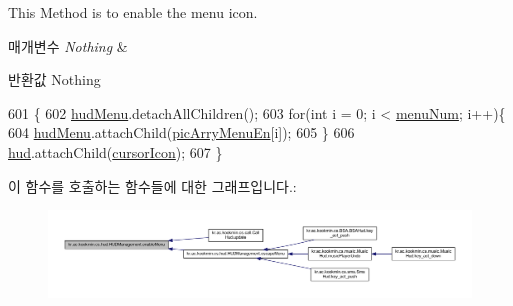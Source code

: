 This Method is to enable the menu icon. 


\begin{DoxyParams}{매개변수}
{\em Nothing} & \\
\hline
\end{DoxyParams}
\begin{DoxyReturn}{반환값}
Nothing 
\end{DoxyReturn}

\begin{DoxyCode}
601   \{
602     \hyperlink{classkr_1_1ac_1_1kookmin_1_1cs_1_1hud_1_1_h_u_d_management_a42b564e79a47075337594ae2a83f4309}{hudMenu}.detachAllChildren();
603     \textcolor{keywordflow}{for}(\textcolor{keywordtype}{int} i = 0; i < \hyperlink{classkr_1_1ac_1_1kookmin_1_1cs_1_1hud_1_1_h_u_d_management_af69baaadf8bdb8b4f429269357fb84d9}{menuNum}; i++)\{
604       \hyperlink{classkr_1_1ac_1_1kookmin_1_1cs_1_1hud_1_1_h_u_d_management_a42b564e79a47075337594ae2a83f4309}{hudMenu}.attachChild(\hyperlink{classkr_1_1ac_1_1kookmin_1_1cs_1_1hud_1_1_h_u_d_management_accf7a9ec5092e5872460755f3b81d6d5}{picArryMenuEn}[i]);
605     \}
606     \hyperlink{classkr_1_1ac_1_1kookmin_1_1cs_1_1hud_1_1_h_u_d_management_a4c4a440b9bdbbe24eb50ee79826aee53}{hud}.attachChild(\hyperlink{classkr_1_1ac_1_1kookmin_1_1cs_1_1hud_1_1_h_u_d_management_a8bd64fe62e6e91c9bd83a274eb59faa9}{cursorIcon});
607   \}
\end{DoxyCode}


이 함수를 호출하는 함수들에 대한 그래프입니다.\+:\nopagebreak
\begin{figure}[H]
\begin{center}
\leavevmode
\includegraphics[width=350pt]{classkr_1_1ac_1_1kookmin_1_1cs_1_1hud_1_1_h_u_d_management_a2d3e988e5636714778382ba504e00c6e_icgraph}
\end{center}
\end{figure}


\hypertarget{classkr_1_1ac_1_1kookmin_1_1cs_1_1hud_1_1_h_u_d_management_af46086e2dbfc7fe58b45bc5d98fe08d8}{}
